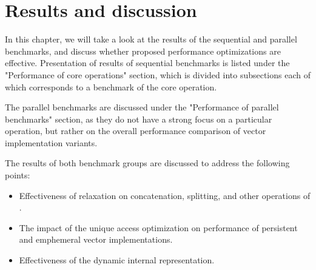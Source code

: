 

\chapter{Results and discussion}

In this chapter, we will take a look at the results of the sequential and parallel benchmarks, and discuss whether proposed performance optimizations are effective. Presentation of results of sequential benchmarks is listed under the "Performance of core operations" section, which is divided into subsections each of which corresponds to a benchmark of the core operation. 

The parallel benchmarks are discussed under the "Performance of parallel benchmarks" section, as they do not have a strong focus on a particular operation, but rather on the overall performance comparison of vector implementation variants. 

The results of both benchmark groups are discussed to address the following points:
\begin{itemize}
    \item Effectiveness of \rrbtree{} relaxation on concatenation, splitting, and other operations of \rrbvec{}. 
    \item The impact of the unique access optimization on performance of persistent and emphemeral vector implementations.
    \item Effectiveness of the dynamic internal representation.         
\end{itemize}

